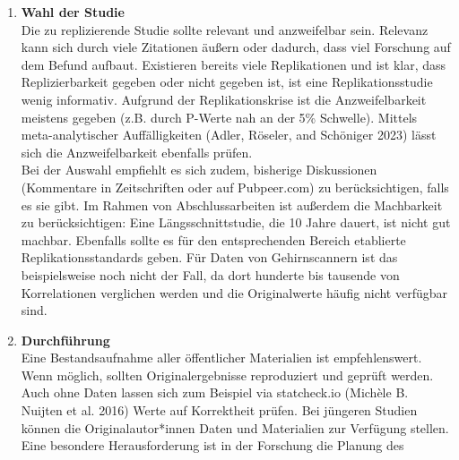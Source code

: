 \documentclass[
  letterpaper,
  DIV=11,
  numbers=noendperiod]{scrreprt}
\begin{document}
\begin{tcolorbox}[enhanced jigsaw, left=2mm, colback=white, colframe=quarto-callout-tip-color-frame, opacitybacktitle=0.6, opacityback=0, title=\textcolor{quarto-callout-tip-color}{\faLightbulb}\hspace{0.5em}{Kurzleitfaden für die Durchführung von Replikationsstudien}, toptitle=1mm, coltitle=black, colbacktitle=quarto-callout-tip-color!10!white, titlerule=0mm, bottomtitle=1mm, leftrule=.75mm, breakable, rightrule=.15mm, bottomrule=.15mm, toprule=.15mm, arc=.35mm]

\begin{enumerate}
\def\labelenumi{\arabic{enumi}.}
\item
  \textbf{Wahl der Studie}\\
  Die zu replizierende Studie sollte relevant und anzweifelbar sein.
  Relevanz kann sich durch viele Zitationen äußern oder dadurch, dass
  viel Forschung auf dem Befund aufbaut. Existieren bereits viele
  Replikationen und ist klar, dass Replizierbarkeit gegeben oder nicht
  gegeben ist, ist eine Replikationsstudie wenig informativ. Aufgrund
  der Replikationskrise ist die Anzweifelbarkeit meistens gegeben (z.B.
  durch P-Werte nah an der 5\% Schwelle). Mittels meta-analytischer
  Auffälligkeiten (Adler, Röseler, and Schöniger 2023) lässt sich die
  Anzweifelbarkeit ebenfalls prüfen.\\
  Bei der Auswahl empfiehlt es sich zudem, bisherige Diskussionen
  (Kommentare in Zeitschriften oder auf Pubpeer.com) zu berücksichtigen,
  falls es sie gibt. Im Rahmen von Abschlussarbeiten ist außerdem die
  Machbarkeit zu berücksichtigen: Eine Längsschnittstudie, die 10 Jahre
  dauert, ist nicht gut machbar. Ebenfalls sollte es für den
  entsprechenden Bereich etablierte Replikationsstandards geben. Für
  Daten von Gehirnscannern ist das beispielsweise noch nicht der Fall,
  da dort hunderte bis tausende von Korrelationen verglichen werden und
  die Originalwerte häufig nicht verfügbar sind.
\item
  \textbf{Durchführung}\\
  Eine Bestandsaufnahme aller öffentlicher Materialien ist
  empfehlenswert. Wenn möglich, sollten Originalergebnisse reproduziert
  und geprüft werden. Auch ohne Daten lassen sich zum Beispiel via
  statcheck.io (Michèle B. Nuijten et al. 2016) Werte auf Korrektheit
  prüfen. Bei jüngeren Studien können die Originalautor*innen Daten und
  Materialien zur Verfügung stellen.\\
  Eine besondere Herausforderung ist in der Forschung die Planung des

\end{enumerate}
\end{tcolorbox}
\end{document}
